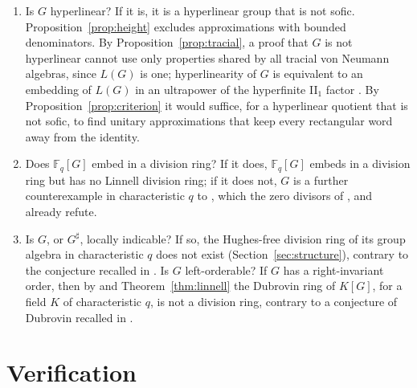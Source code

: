\documentclass[11pt]{article}
\theoremstyle{definition}
\theoremstyle{remark}
\numberwithin{equation}{section}
\newcommand{\F}{\mathbb F}
\begin{document}
\begin{enumerate}[label=(\arabic*),leftmargin=*]
\item Is $G$ hyperlinear? If it is, it is a hyperlinear group that is not sofic. Proposition~\ref{prop:height} excludes approximations with bounded denominators. By Proposition~\ref{prop:tracial}, a proof that $G$ is not hyperlinear cannot use only properties shared by all tracial von Neumann algebras, since $L(G)$ is one; hyperlinearity of $G$ is equivalent to an embedding of $L(G)$ in an ultrapower of the hyperfinite II$_1$ factor \cite[Theorem~8.5]{Pestov2008}. By Proposition~\ref{prop:criterion} it would suffice, for a hyperlinear quotient that is not sofic, to find unitary approximations that keep every rectangular word away from the identity.
\item Does $\F_q[G]$ embed in a division ring? If it does, $\F_q[G]$ embeds in a division ring but has no Linnell division ring; if it does not, $G$ is a further counterexample in characteristic $q$ to \cite[Conjecture~1.1]{FSP2026}, which the zero divisors of \cite{OAI196}, \cite{Ivanov2026} and \cite{DMzd} already refute.
\item Is $G$, or $G^\sharp$, locally indicable? If so, the Hughes-free division ring of its group algebra in characteristic $q$ does not exist (Section~\ref{sec:structure}), contrary to the conjecture recalled in \cite[Section~2.3]{JZL2025}. Is $G$ left-orderable? If $G$ has a right-invariant order, then by \cite[Proposition~2.4]{JZL2025} and Theorem~\ref{thm:linnell} the Dubrovin ring of $K[G]$, for a field $K$ of characteristic $q$, is not a division ring, contrary to a conjecture of Dubrovin \cite{Dubrovin1987} recalled in \cite[Section~2.3]{JZL2025}.
\end{enumerate}

\section{Verification}\label{sec:verification}
\end{document}
